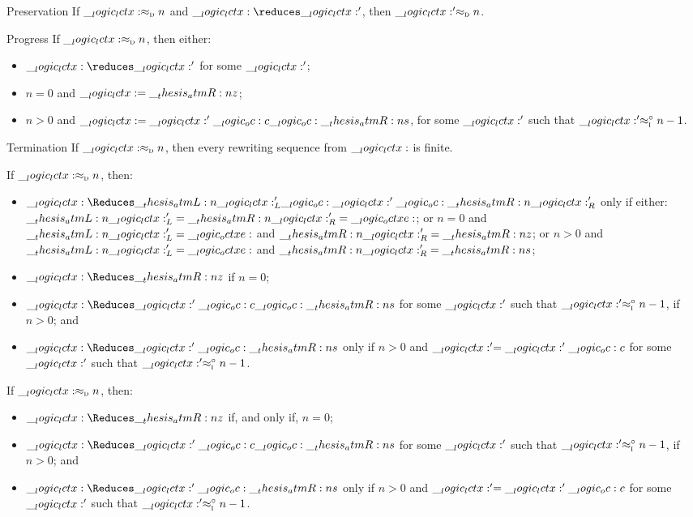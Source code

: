 \begin{theorem}
  \leavevmode
  \begin{thmdescription}
  \item[Preservation]
    If $\__logic_lctx: \approx\sb{\text{\normalfont\scshape d}} n$ and $\lctx \reduces \lctx'$, then $\__logic_lctx:' \approx\sb{\text{\normalfont\scshape d}} n$.

  \item[Progress]
    If $\__logic_lctx: \approx\sb{\text{\normalfont\scshape d}} n$, then either:
    \begin{itemize}[nosep]
    \item $\lctx \reduces \lctx'$ for some $\__logic_lctx:'$;
    \item $n = 0$ and $\__logic_lctx: = \__thesis_atmR:n {z}$;
    \item $n > 0$ and $\__logic_lctx: = \__logic_lctx:' \__logic_oc: c \__logic_oc: \__thesis_atmR:n {s}$, for some $\__logic_lctx:'$ such that $\__logic_lctx:' \approx\sb{\text{\normalfont\scshape i}}^{\circ} n-1$.
    \end{itemize}

  \item[Termination]
    If $\__logic_lctx: \approx\sb{\text{\normalfont\scshape d}} n$, then every rewriting sequence from $\__logic_lctx:$ is finite.
  \end{thmdescription}
\end{theorem}

\begin{theorem}
  If $\__logic_lctx: \approx\sb{\text{\normalfont\scshape d}} n$, then:
  \begin{itemize}[nosep]
  \item $\lctx \Reduces \atmL{\lctx}'_L \oc \lctx' \oc \atmR{\lctx}'_R$ only if either: $\__thesis_atmL:n {\__logic_lctx:}'_L = \__thesis_atmR:n {\__logic_lctx:}'_R = \__logic_octxe:$; or $n = 0$ and $\__thesis_atmL:n {\__logic_lctx:}'_L = \__logic_octxe:$ and $\__thesis_atmR:n {\__logic_lctx:}'_R = \__thesis_atmR:n {z}$; or $n > 0$ and $\__thesis_atmL:n {\__logic_lctx:}'_L = \__logic_octxe:$ and $\__thesis_atmR:n {\__logic_lctx:}'_R = \__thesis_atmR:n {s}$;
  \item $\lctx \Reduces \atmR{z}$ if $n = 0$;
  \item $\lctx \Reduces \lctx' \oc c \oc \atmR{s}$ for some $\__logic_lctx:'$ such that $\__logic_lctx:' \approx\sb{\text{\normalfont\scshape i}}^{\circ} n-1$, if $n > 0$; and 
  \item $\lctx \Reduces \lctx' \oc \atmR{s}$ only if $n > 0$ and $\__logic_lctx:' = \__logic_lctx:' \__logic_oc: c$ for some $\__logic_lctx:'$ such that $\__logic_lctx:' \approx\sb{\text{\normalfont\scshape i}}^{\circ} n-1$.
  \end{itemize}
\end{theorem}

\begin{theorem}
  If $\__logic_lctx: \approx\sb{\text{\normalfont\scshape d}} n$, then:
  \begin{itemize}[nosep]
  \item $\lctx \Reduces \atmR{z}$ if, and only if, $n = 0$;
  \item $\lctx \Reduces \lctx' \oc c \oc \atmR{s}$ for some $\__logic_lctx:'$ such that $\__logic_lctx:' \approx\sb{\text{\normalfont\scshape i}}^{\circ} n-1$, if $n > 0$; and 
  \item $\lctx \Reduces \lctx' \oc \atmR{s}$ only if $n > 0$ and $\__logic_lctx:' = \__logic_lctx:' \__logic_oc: c$ for some $\__logic_lctx:'$ such that $\__logic_lctx:' \approx\sb{\text{\normalfont\scshape i}}^{\circ} n-1$.
  \end{itemize}
\end{theorem}

